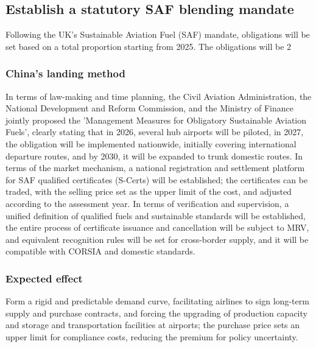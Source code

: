 \documentclass[a4paper,11pt]{article}
\begin{document}
\subsection{Establish a statutory SAF blending mandate}
Following the UK's Sustainable Aviation Fuel (SAF) mandate, obligations will be set based on a total proportion starting from 2025. The obligations will be 2%

\subsubsection{China's landing method}
In terms of law-making and time planning, the Civil Aviation Administration, the National Development and Reform Commission, and the Ministry of Finance jointly proposed the 'Management Measures for Obligatory Sustainable Aviation Fuels', clearly stating that in 2026, several hub airports will be piloted, in 2027, the obligation will be implemented nationwide, initially covering international departure routes, and by 2030, it will be expanded to trunk domestic routes. In terms of the market mechanism, a national registration and settlement platform for SAF qualified certificates (S-Certs) will be established; the certificates can be traded, with the selling price set as the upper limit of the cost, and adjusted according to the assessment year. In terms of verification and supervision, a unified definition of qualified fuels and sustainable standards will be established, the entire process of certificate issuance and cancellation will be subject to MRV, and equivalent recognition rules will be set for cross-border supply, and it will be compatible with CORSIA and domestic standards.

\subsubsection{Expected effect}
Form a rigid and predictable demand curve, facilitating airlines to sign long-term supply and purchase contracts, and forcing the upgrading of production capacity and storage and transportation facilities at airports; the purchase price sets an upper limit for compliance costs, reducing the premium for policy uncertainty.
\end{document}
